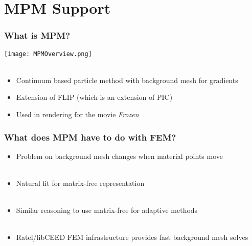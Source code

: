 \documentclass{beamer}
\begin{document}
\section{MPM Support}

\begin{frame}
\begin{center}
\frametitle{What is MPM?}

\texttt{[image: MPMOverview.png]}\\

~\\

\begin{itemize}

\item Continuum based particle method with background mesh for gradients\\

\item Extension of FLIP (which is an extension of PIC)\\

\item Used in rendering for the movie \emph{Frozen}\\

\end{itemize}

\end{center}
\end{frame}


\begin{frame}
\begin{center}
\frametitle{What does MPM have to do with FEM?}

\begin{itemize}

\item Problem on background mesh changes when material points move\\

~\\

\item Natural fit for matrix-free representation\\

~\\

\item Similar reasoning to use matrix-free for adaptive methods\\

~\\

\item Ratel/libCEED FEM infrastructure provides fast background mesh solves\\

\end{itemize}

\end{center}
\end{frame}
\end{document}
